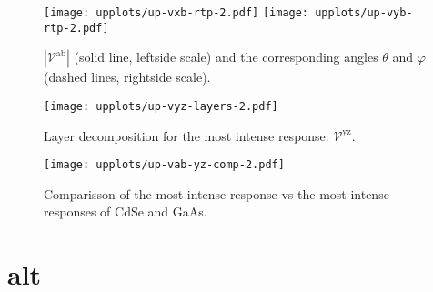\documentclass{article}
\let\Oldsection\section
\renewcommand{\section}{\FloatBarrier\Oldsection}
\begin{document}
\begin{figure}[ht]
    \centering
    \texttt{[image: upplots/up-vxb-rtp-2.pdf]}
    \texttt{[image: upplots/up-vyb-rtp-2.pdf]}
    \caption{$|\mathcal{V}^{\mathrm{ab}}|$ (solid line, leftside scale) and the
    corresponding angles $\theta$ and $\varphi$ (dashed lines, rightside scale).}
    \label{fig:up-rtp2}
\end{figure}

\begin{figure}[ht]
    \centering
    \texttt{[image: upplots/up-vyz-layers-2.pdf]}
    \caption{Layer decomposition for the most intense response:
    $\mathcal{V}^{\mathrm{yz}}$.}
    \label{fig:up-lay2}
\end{figure}

\begin{figure}[ht]
    \centering
    \texttt{[image: upplots/up-vab-yz-comp-2.pdf]}
    \caption{Comparisson of the most intense response vs the most intense
    responses of CdSe and GaAs.}
    \label{fig:up-comp2}
\end{figure}





\section{alt} %
\label{sec:alt}


\end{document}
